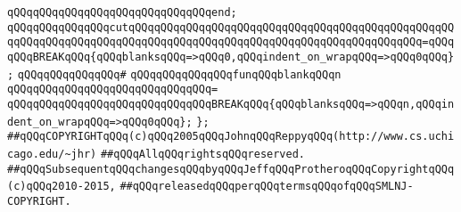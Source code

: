 \verb|qQQqqQQqqQQqqQQqqQQqqQQqqQQqqQQqend;|\newline
\newline
\verb|qQQqqQQqqQQqqQQqcutqQQqqQQqqQQqqQQqqQQqqQQqqQQqqQQqqQQqqQQqqQQqqQQqqQQqqQQqqQQqqQQqqQQqqQQqqQQqqQQqqQQqqQQqqQQqqQQqqQQqqQQqqQQqqQQqqQQq=qQQqqQQqBREAKqQQq{qQQqblanksqQQq=>qQQq0,qQQqindent_on_wrapqQQq=>qQQq0qQQq};|\newline
\verb|qQQqqQQqqQQqqQQq#|\newline
\verb|qQQqqQQqqQQqqQQqfunqQQqblankqQQqn|\newline
\verb|qQQqqQQqqQQqqQQqqQQqqQQqqQQqqQQq=|\newline
\verb|qQQqqQQqqQQqqQQqqQQqqQQqqQQqqQQqBREAKqQQq{qQQqblanksqQQq=>qQQqn,qQQqindent_on_wrapqQQq=>qQQq0qQQq};|\newline
\newline
\newline
\verb|};|\newline
\newline
\newline
\newline
\verb|##qQQqCOPYRIGHTqQQq(c)qQQq2005qQQqJohnqQQqReppyqQQq(http://www.cs.uchicago.edu/~jhr)|\newline
\verb|##qQQqAllqQQqrightsqQQqreserved.|\newline
\verb|##qQQqSubsequentqQQqchangesqQQqbyqQQqJeffqQQqProtheroqQQqCopyrightqQQq(c)qQQq2010-2015,|\newline
\verb|##qQQqreleasedqQQqperqQQqtermsqQQqofqQQqSMLNJ-COPYRIGHT.|\newline

